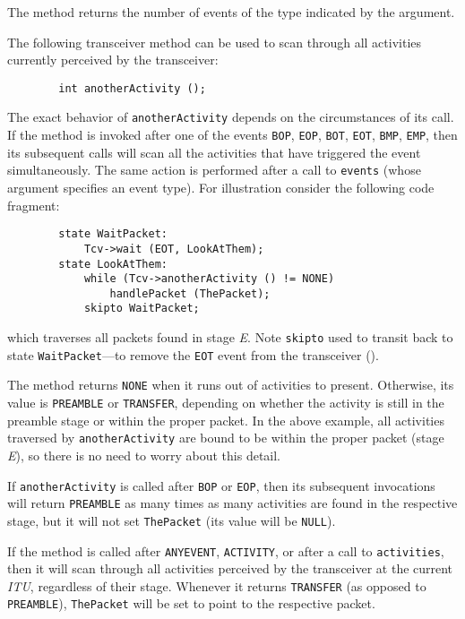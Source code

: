\bigskip

\noindent
The method returns the number of events of the type indicated by the
argument.

The following transceiver method can be used to scan through all activities
currently perceived by the transceiver:
\begin{verbatim}
        int anotherActivity ();
\end{verbatim}
\noindent
The exact behavior of {\tt anotherActivity} depends on the circumstances of
its call.
If the method is invoked after one of the events {\tt BOP}, {\tt EOP},
{\tt BOT}, {\tt EOT}, {\tt BMP}, {\tt EMP},
then its subsequent calls will scan all the activities that have
triggered the event simultaneously.
The same action is performed after a call to {\tt events} (whose argument
specifies an event type).
For illustration consider the following code fragment:
\begin{verbatim}
        state WaitPacket:
            Tcv->wait (EOT, LookAtThem);
        state LookAtThem:
            while (Tcv->anotherActivity () != NONE)
                handlePacket (ThePacket);
            skipto WaitPacket;
\end{verbatim}
\noindent
which traverses all packets found in stage {\em E}.
Note {\tt skipto} used to transit back to state {\tt WaitPacket}---to 
remove the {\tt EOT} event from the transceiver ().

The method returns {\tt NONE} when it runs out of activities to present.
Otherwise, its value is
{\tt PREAMBLE} or {\tt TRANSFER}, depending on whether the activity is still
in the preamble stage or within the proper packet.
In the above example, all activities traversed by {\tt anotherActivity} are
bound to be within the proper packet (stage {\em E\/}), so there is no
need to worry about this detail.

If {\tt anotherActivity} is called after {\tt BOP} or {\tt EOP},
then its subsequent invocations
will return {\tt PREAMBLE} as many times as many activities are found in the
respective stage, but it will not set {\tt ThePacket} (its value will be
{\tt NULL}).

If the method is called after {\tt ANYEVENT}, {\tt ACTIVITY}, or after
a call to {\tt activities}, then it will scan through
all activities perceived by the transceiver at the current {\em ITU},
regardless of their stage.
Whenever it returns {\tt TRANSFER} (as opposed to {\tt PREAMBLE}),
{\tt ThePacket} will be set to point to the respective packet.

